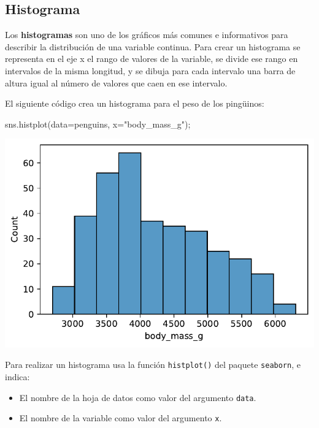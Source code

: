 \documentclass[
  a4paper,
  noprof,
  12pt,
  notoc,
  nosols,
  nobib]{mnye}
\newenvironment{Shaded}{\begin{snugshade}}{\end{snugshade}}
\newcommand{\NormalTok}[1]{\textcolor[rgb]{0.00,0.23,0.31}{#1}}
\newcommand{\OperatorTok}[1]{\textcolor[rgb]{0.37,0.37,0.37}{#1}}
\newcommand{\StringTok}[1]{\textcolor[rgb]{0.13,0.47,0.30}{#1}}
\providecommand{\tightlist}{%
  \setlength{\itemsep}{0pt}\setlength{\parskip}{0pt}}\usepackage{longtable,booktabs,array}
\theoremstyle{definition}
\theoremstyle{remark}
\begin{document}
\subsection{Histograma}\label{sec-1numerical-histogram}

Los \textbf{histogramas} son uno de los gráficos más comunes e
informativos para describir la distribución de una variable continua.
Para crear un histograma se representa en el eje x el rango de valores
de la variable, se divide ese rango en intervalos de la misma longitud,
y se dibuja para cada intervalo una barra de altura igual al número de
valores que caen en ese intervalo.

El siguiente código crea un histograma para el peso de los pingüinos:

\begin{Shaded}
\begin{Highlighting}[]
\NormalTok{sns.histplot(data}\OperatorTok{=}\NormalTok{penguins, x}\OperatorTok{=}\StringTok{"body\_mass\_g"}\NormalTok{)}\OperatorTok{;}
\end{Highlighting}
\end{Shaded}

\includegraphics{chapters/1numerical_files/figure-pdf/cell-5-output-1.pdf}

\begin{tcolorbox}[enhanced jigsaw, colframe=quarto-callout-note-color-frame, rightrule=.15mm, breakable, left=2mm, bottomrule=.15mm, arc=.35mm, leftrule=.75mm, opacityback=0, toprule=.15mm, colback=white]
\begin{minipage}[t]{5.5mm}
\textcolor{quarto-callout-note-color}{\faInfo}
\end{minipage}%
\begin{minipage}[t]{\textwidth - 5.5mm}

Para realizar un histograma usa la función \texttt{histplot()} del
paquete \texttt{seaborn}, e indica:

\begin{itemize}
\tightlist
\item
  El nombre de la hoja de datos como valor del argumento \texttt{data}.
\item
  El nombre de la variable como valor del argumento \texttt{x}.
\end{itemize}

\end{minipage}%
\end{tcolorbox}
\end{document}
